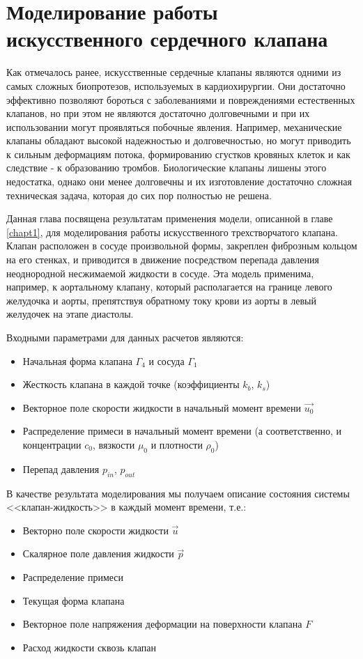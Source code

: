 \chapter{Моделирование работы искусственного сердечного клапана} \label{chapt3}

Как отмечалось ранее, искусственные сердечные клапаны являются одними из самых
сложных биопротезов, используемых в кардиохирургии. Они достаточно эффективно
позволяют бороться с заболеваниями и повреждениями естественных клапанов, но
при этом не являются достаточно долговечными и при их использовании могут
проявляться побочные явления. Например, механические клапаны обладают высокой
надежностью и долговечностью, но могут приводить к сильным деформациям потока,
формированию сгустков кровяных клеток и как следствие - к образованию тромбов.
Биологические клапаны лишены этого недостатка, однако они менее долговечны и их
изготовление достаточно сложная техническая задача, которая до сих пор
полностью не решена.

Данная глава посвящена результатам применения модели, описанной в главе \ref{chapt1},
для моделирования работы искусственного трехстворчатого клапана. Клапан расположен в
сосуде произвольной формы, закреплен фиброзным кольцом на его стенках, и приводится
в движение посредством перепада давления неоднородной несжимаемой жидкости в сосуде.
Эта модель применима, например, к аортальному клапану, который располагается на
границе левого желудочка и аорты, препятствуя обратному току крови из аорты в
левый желудочек на этапе диастолы.

Входными параметрами для данных расчетов являются:
\begin{itemize}
    \item Начальная форма клапана $\Gamma_4$ и сосуда $\Gamma_1$
    \item Жесткость клапана в каждой точке (коэффициенты $k_b$, $k_s$)
    \item Векторное поле скорости жидкости в начальный момент времени $\vec{u_0}$
    \item Распределение примеси в начальный момент времени
            (а соответственно, и концентрации $c_0$, вязкости $\mu_0$ и плотности $\rho_0$)
    \item Перепад давления $p_{in}$, $p_{out}$
\end{itemize}

В качестве результата моделирования мы получаем описание состояния системы
<<клапан-жидкость>> в каждый момент времени, т.е.:
\begin{itemize}
    \item Векторно поле скорости жидкости $\vec{u}$
    \item Скалярное поле давления жидкости $\vec{p}$
    \item Распределение примеси
    \item Текущая форма клапана
    \item Векторное поле напряжения деформации на поверхности клапана $F$
    \item Расход жидкости сквозь клапан
\end{itemize}

